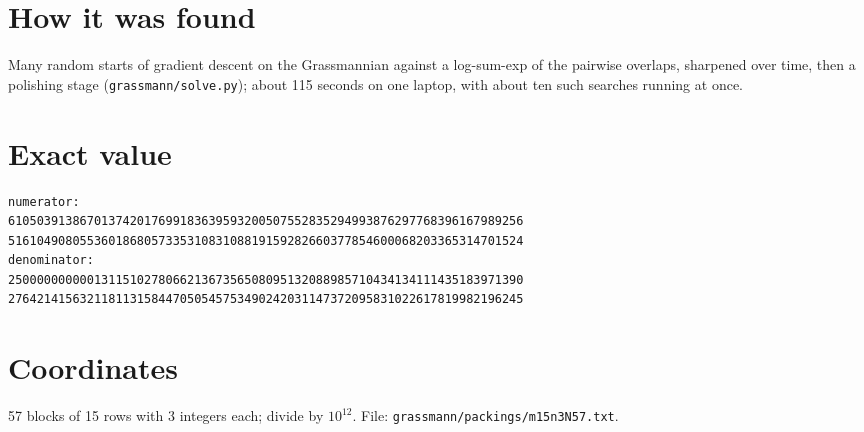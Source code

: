 \documentclass[11pt,a4paper]{article}
\begin{document}
\section{How it was found}
Many random starts of gradient descent on the Grassmannian against a log-sum-exp of the pairwise overlaps, sharpened over time, then a polishing stage (\texttt{grassmann/solve.py}); about 115 seconds on one laptop, with about ten such searches running at once.


\appendix
\section{Exact value}
{\small
\begin{verbatim}
numerator:
610503913867013742017699183639593200507552835294993876297768396167989256
516104908055360186805733531083108819159282660377854600068203365314701524
denominator:
250000000000131151027806621367356508095132088985710434134111435183971390
276421415632118113158447050545753490242031147372095831022617819982196245
\end{verbatim}}

\section{Coordinates}
57 blocks of 15 rows with 3 integers each; divide by $10^{12}$. File: \texttt{grassmann/packings/m15n3N57.txt}.
{\tiny
\begin{multicols}{3}
\end{multicols}}
\end{document}
